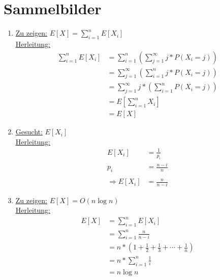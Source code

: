 \documentclass[a4paper,10pt]{scrartcl}
\begin{document}
\section{Sammelbilder}
\begin{enumerate}
\item 
	\underline{Zu zeigen:} $E[X] = \sum\limits_{i = 1}^{n} E[X_{i}]$\\
	\underline{Herleitung:} \begin{align*}
		\sum\limits_{i = 1}^{n} E\left[X_{i}\right] &= \sum\limits_{i = 1}^{n}\left(\sum\limits_{j = 1}^{\infty}j * P\left(X_{i} = j\right)\right)\\
		&=\sum\limits_{j = 1}^{\infty}\left(\sum\limits_{i = 1}^{n}j * P\left(X_{i} = j\right)\right)\\
		&=\sum\limits_{j = 1}^{\infty}j * \left(\sum\limits_{i = 1}^{n}P\left(X_{i} = j\right)\right)\\
		&= E\left[\sum\limits_{i = 1}^{n}X_{i}\right]\\
		&= E\left[X\right]
	\end{align*}
	
\item 
	\underline{Gesucht:} $E[X_{i}]$\\
	\underline{Herleitung:} \begin{align*}
		E\left[X_{i}\right] &= \frac{1}{p_{i}}\\
		p_{i} &= \frac{n-i}{n}\\
		\\
		\Rightarrow E\left[X_{i}\right] &= \frac{n}{n-i}	
	\end{align*}
\item 
	\underline{Zu zeigen:} $E[X] = O(n \log n)$\\
	\underline{Herleitung:} \begin{align*}
		E\left[X\right] &= \sum\limits_{i = 1}^{n}E\left[X_{i}\right]\\
		&= \sum\limits_{i = 1}^{n}\frac{n}{n - i}\\
		&= n * \left(1 + \frac{1}{2} + \frac{1}{3} + \cdots + \frac{1}{n}\right)\\
		&= n * \sum\limits_{i = 1}^{n}\frac{1}{i}\\
		&= n \log n
	\end{align*}
\end{enumerate}
\end{document}
